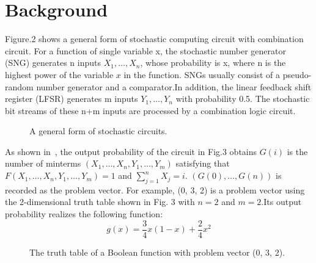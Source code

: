 \documentclass[conference,letterpaper]{IEEEtran}
\begin{document}
\section*{Background}
Figure.2 shows a general form of stochastic computing circuit with combination circuit. For a function of single variable x, the stochastic number generator (SNG) generates n inputs $X_{1}, \ldots, X_{n}$, whose probability is x, where n is the highest power of the variable $x$ in the function. SNGs usually consist of a pseudo-random number generator and a comparator.In addition, the linear feedback shift register (LFSR) generates m inputs $Y_{1}, \ldots, Y_{n}$ with probability 0.5. The stochastic bit streams of these n+m inputs are processed by a combination logic circuit.

\begin{figure}[t]
    \setlength{\abovecaptionskip}{0.cm}
    \setlength{\belowcaptionskip}{-0.5cm}
    \centering
    \caption{A general form of stochastic circuits.}
\end{figure}
As shown in~\cite{2}, the output probability of the circuit in Fig.3 obtains $G(i)$ is the number of minterms $\left(X_{1}, \ldots, X_{n}, Y_{1}, \ldots, Y_{m}\right)$ satisfying that $F\left(X_{1}, \ldots, X_{n}, Y_{1}, \ldots, Y_{m}\right)=1$ and $\sum_{j=1}^{n} X_{j}=i$. $(G(0), \ldots, G(n))$ is recorded as the problem vector. For example, (0, 3, 2) is a problem vector using the 2-dimensional truth table shown in Fig. 3 with $n=2$ and $m=2$.Its output probability realizes the following function:
\begin{equation}
g(x)=\frac{3}{4} x(1-x)+\frac{2}{4} x^{2}
\end{equation}
\begin{figure}
    \setlength{\abovecaptionskip}{0.cm}
    \setlength{\belowcaptionskip}{-0.5cm}
    \centering
    \caption{The truth table of a Boolean function with problem vector (0, 3, 2).}
\end{figure}
\end{document}
